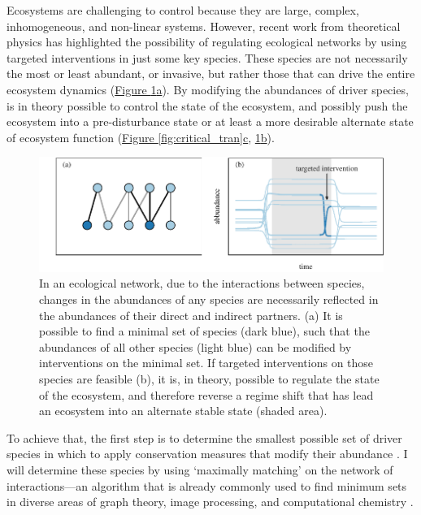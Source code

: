 \documentclass[a4paper]{article}
\begin{document}
Ecosystems are challenging to control because they are large, complex, inhomogeneous, and non-linear systems.
However, recent work from theoretical physics has highlighted the possibility of regulating ecological networks by using targeted interventions in just some key species.
These species are not necessarily the most or least abundant, or invasive, but rather those that can drive the entire ecosystem dynamics \autocite{Liu2011} (\hyperref[fig:control_net]{Figure \ref{fig:control_net}a}).
By modifying the abundances of driver species, is in theory possible to control the state of the ecosystem, and possibly push the ecosystem into a pre-disturbance state or at least a more desirable alternate state of ecosystem function (\hyperref[fig:critical_tran]{Figure \ref{fig:critical_tran}c}, \hyperref[fig:control_net]{\ref{fig:control_net}b}).

\begin{figure}
  \centering
  \includegraphics{control_net}
  \caption{
  \label{fig:control_net}
  In an ecological network, due to the interactions between species, changes in the abundances of any species are necessarily reflected in the abundances of their direct and indirect partners.
  (a) It is possible to find a minimal set of species (dark blue), such that the abundances of all other species (light blue) can be modified by interventions on the minimal set.
  If targeted interventions on those species are feasible (b), it is, in theory, possible to regulate the state of the ecosystem, and therefore reverse a regime shift that has lead an ecosystem into an alternate stable state (shaded area).
  }
\end{figure}

To achieve that, the first step is to determine the smallest possible set of driver species in which to apply conservation measures that modify their abundance \autocite{Liu2011, Isbell2013}.
I will determine these species by using `maximally matching' on the network of interactions---an algorithm that is already commonly used to find minimum sets in diverse areas of graph theory, image processing, and computational chemistry \autocite{Hopcroft1973,Neumann2010}.
\end{document}
